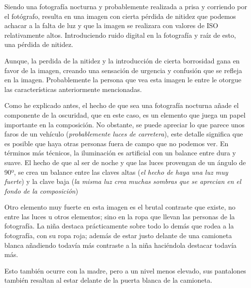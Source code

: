 \documentclass[11pt]{article}
\begin{document}
Siendo una fotografía nocturna y probablemente realizada a prisa y corriendo por el fotógrafo, resulta en una imagen con cierta pérdida de nitidez que podemos achacar a la falta de luz y que la imagen se realizara con valores de ISO relativamente altos. Introduciendo ruido digital en la fotografía y raíz de esto, una pérdida de nitidez. \newline

Aunque, la perdida de la nitidez y la introducción de cierta borrosidad gana en favor de la imagen, creando una sensación de urgencia y confusión que se refleja en la imagen. Probablemente la persona que vea esta imagen le entre le otorgue las características anteriormente mencionadas.  \newline

Como he explicado antes, el hecho de que sea una fotografía nocturna añade el componente de la oscuridad, que en este caso, es un elemento que juega un papel importante en la composición. No obstante, se puede apreciar lo que parece unos faros de un vehículo (\textit{probablemente luces de carretera}), este detalle significa que es posible que haya otras personas fuera de campo que no podemos ver. 
En términos más técnicos, la iluminación es artificial con un balance entre dura y suave. El hecho de que al ser de noche y que las luces provengan de un ángulo de 90º, se crea un balance entre las claves altas (\textit{el hecho de haya una luz muy fuerte}) y la clave baja (\textit{la misma luz crea muchas sombras que se aprecian en el fondo de la composición})  \newline


Otro elemento muy fuerte en esta imagen es el brutal contraste que existe, no entre las luces u otros elementos; sino en la ropa que llevan las personas de la fotografía. La niña destaca prácticamente sobre todo lo demás que rodea a la fotografía, con su ropa roja; además de estar justo delante de una camioneta blanca añadiendo todavía más contraste a la niña haciéndola destacar todavía más. 

Esto también ocurre con la madre, pero a un nivel menos elevado, sus pantalones también resaltan al estar delante de la puerta blanca de la camioneta. \newline







\newpage

\printbibliography
\newpage

\blinddocument
\end{document}
